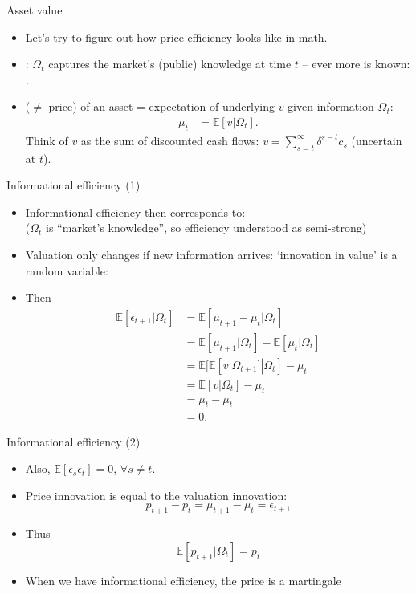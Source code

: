 \documentclass[english,10pt
,aspectratio=169
]{beamer}
\begin{document}
\begin{frame}{Asset value}
	\begin{itemize}
		\item Let's try to figure out how price efficiency looks like in math.
		\item {}: $\Omega_t$ captures the market's (public) knowledge at time $t$ -- ever more is known: 
		. 
		
		\item {} ($\neq$ price) of an asset = expectation of underlying  $v$ given information $\Omega_{t}$:
		\begin{align*}
			\mu_t &= \mathbb{E} \left[ v | \Omega_t \right].
		\end{align*}
		Think of $v$ as the sum of discounted cash flows: $v = \sum_{s=t}^{\infty} \delta^{s-t} c_s$ (uncertain at $t$).
	\end{itemize}
\end{frame}


\begin{frame}{Informational efficiency (1)}
\begin{itemize}
	\item Informational efficiency then corresponds to: 
	\\
	($\Omega_t$ is ``market's knowledge'', so efficiency understood as semi-strong)
	\item Valuation only changes if new information arrives: `innovation in value' is a random variable: 
	\item Then
	\begin{align*}
		\mathbb{E}[\epsilon_{t+1}|\Omega_t] 
		& = \mathbb{E}[\mu_{t+1} - \mu_t|\Omega_t]\\
		& = \mathbb{E}[\mu_{t+1}|\Omega_t] - \mathbb{E}[\mu_t|\Omega_t]\\  
		& = \mathbb{E}[ \mathbb{E}[v|\Omega_{t+1}]|\Omega_t] - \mu_t\\  
		& = \mathbb{E}[v|\Omega_t] - \mu_t\\  
		& = \mu_t- \mu_t\\  
		& = 0.
	\end{align*}
\end{itemize}
\end{frame}


\begin{frame}{Informational efficiency (2)}
	\begin{itemize}
	 \item Also, $\mathbb{E}[\epsilon_{s}\epsilon_t]=0$, $\forall s \ne t$.
	\item Price innovation is equal to the valuation innovation:
	\[
	p_{t+1} - p_t = \mu_{t+1} - \mu_t = \epsilon_{t+1}
	\]
	\item Thus
	\[
	\mathbb{E}[p_{t+1}|\Omega_{t}] = p_t
	\]
	\item When we have informational efficiency, the price is a \alert{martingale}
\end{itemize}
\end{frame}
\end{document}
